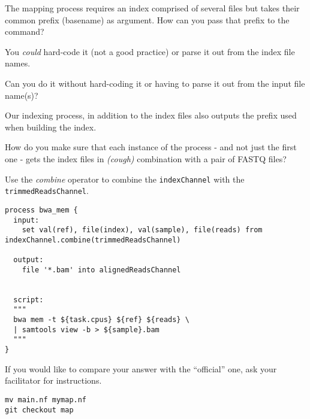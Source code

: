 \begin{questions}

The mapping process requires an index comprised of several files but takes their common prefix (basename) 
as argument. How can you pass that prefix to the command?\\

\begin{answer}
You \emph{could} hard-code it (not a good practice) or parse it out from the index file names. 
\end{answer}

Can you do it without hard-coding it or having to parse it out from the input file name(s)?\\

\begin{answer}
Our indexing process, in addition to the index files also outputs the prefix used when building the index. \\
\end{answer}

How do you make sure that each instance of the process - and not just the first one - gets the index files in \emph{(cough)} combination with a pair of FASTQ files?\\

\begin{answer}
Use the \emph{combine} operator to combine the \texttt{indexChannel} with the \texttt{trimmedReadsChannel}.

\begin{lstlisting}
process bwa_mem {
  input:
    set val(ref), file(index), val(sample), file(reads) from indexChannel.combine(trimmedReadsChannel)

  output:
    file '*.bam' into alignedReadsChannel

    
  script:
  """
  bwa mem -t ${task.cpus} ${ref} ${reads} \
  | samtools view -b > ${sample}.bam
  """
}
\end{lstlisting}
\end{answer}


If you would like to compare your answer with the ``official'' one, ask your facilitator for instructions. 
\begin{answer}
\begin{lstlisting}
mv main.nf mymap.nf
git checkout map
\end{lstlisting}
\end{answer}
\end{questions}



